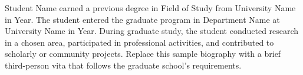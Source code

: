 Student Name earned a previous degree in Field of Study from University Name in Year. The student entered the graduate program in Department Name at University Name in Year. During graduate study, the student conducted research in a chosen area, participated in professional activities, and contributed to scholarly or community projects. Replace this sample biography with a brief third-person vita that follows the graduate school's requirements.
